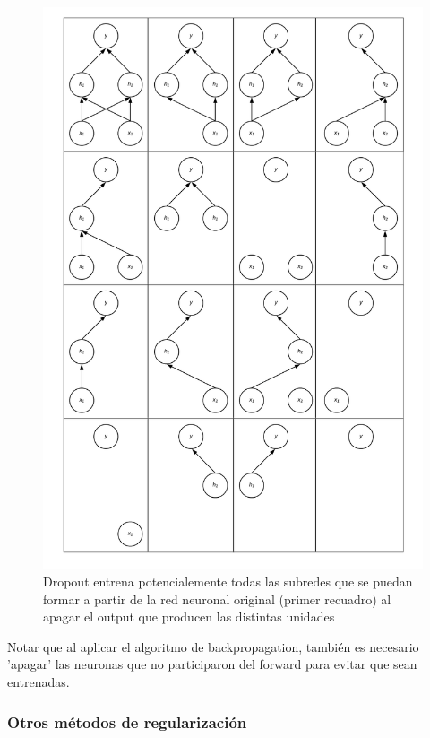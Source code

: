 \begin{figure}[H]
	\captionsetup{font=small,labelfont=small}
	\caption{Dropout entrena potencialemente todas las subredes que se puedan formar a partir de la red neuronal original (primer recuadro) al apagar el output que producen las distintas unidades}
	\centering
	\includegraphics[scale=.25]{img/cap7_Dropout.png}
\end{figure}

Notar que al aplicar el algoritmo de backpropagation, también es necesario 'apagar' las neuronas que no participaron del forward para evitar que sean entrenadas. 

\subsubsection{Otros m\'etodos de regularizaci\'on}


